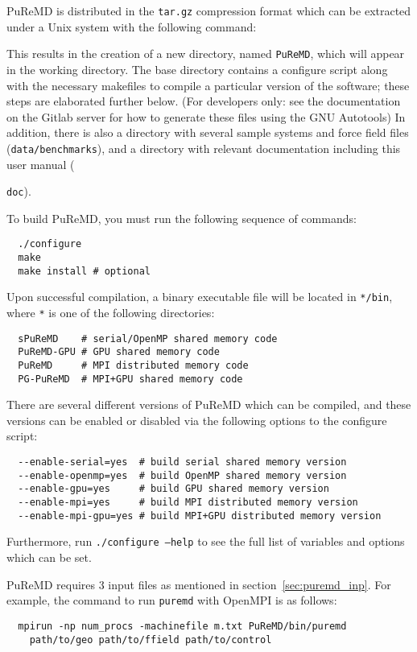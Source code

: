\documentclass{article}
\begin{document}
PuReMD is distributed in the \texttt{tar.gz} compression format which can 
be extracted under a Unix system with the following command:

This results in the creation of a new directory, named \texttt{PuReMD}, which will
appear in the working directory. The base directory contains a configure script
along with the necessary makefiles to compile a particular version of the
software; these steps are elaborated further below.  (For developers only: see
the documentation on the Gitlab server for how to generate these files using
the GNU Autotools) In addition, there is also a directory with several sample
systems and force field files (\texttt{data/benchmarks}), and a
directory with relevant documentation including this user manual
({\texttt{doc}).

To build PuReMD, you must run the following sequence of commands:
\begin{verbatim}
  ./configure
  make
  make install # optional
\end{verbatim}

Upon successful compilation, a binary executable file will be located
in \texttt{*/bin}, where \texttt{*} is one of the
following directories:
\begin{verbatim}
  sPuReMD    # serial/OpenMP shared memory code
  PuReMD-GPU # GPU shared memory code
  PuReMD     # MPI distributed memory code
  PG-PuReMD  # MPI+GPU shared memory code
\end{verbatim}

There are several different versions of PuReMD which can be compiled,
and these versions can be enabled or disabled via the following options
to the configure script:
\begin{verbatim}
  --enable-serial=yes  # build serial shared memory version
  --enable-openmp=yes  # build OpenMP shared memory version
  --enable-gpu=yes     # build GPU shared memory version
  --enable-mpi=yes     # build MPI distributed memory version
  --enable-mpi-gpu=yes # build MPI+GPU distributed memory version
\end{verbatim}
Furthermore, run \texttt{./configure --help} to see the full list
of variables and options which can be set.

PuReMD requires 3 input files as mentioned in section~\ref{sec:puremd_inp}. 
For example, the command to run \texttt{puremd} with OpenMPI is as follows:
\begin{verbatim}
  mpirun -np num_procs -machinefile m.txt PuReMD/bin/puremd
    path/to/geo path/to/ffield path/to/control
\end{verbatim}

}
\end{document}

